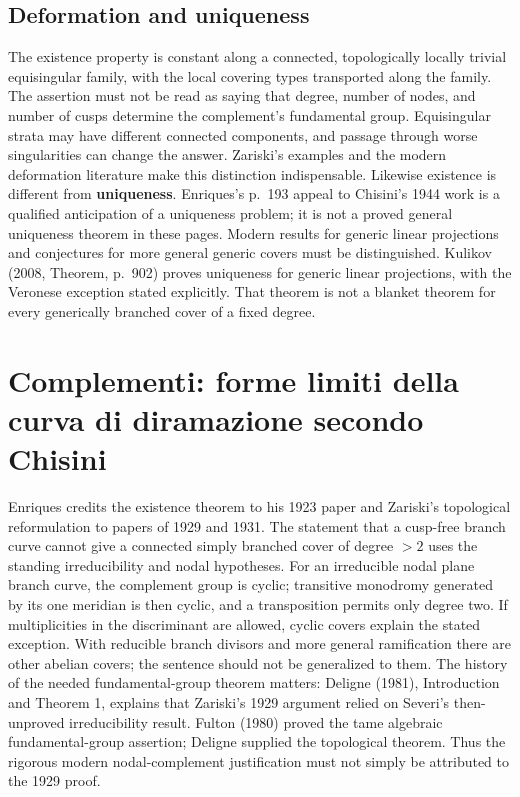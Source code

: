 \subsection{Deformation and uniqueness}

The existence property is constant along a connected, topologically locally trivial equisingular family, with the local covering types transported along the family. The assertion must not be read as saying that degree, number of nodes, and number of cusps determine the complement's fundamental group. Equisingular strata may have different connected components, and passage through worse singularities can change the answer. Zariski's examples and the modern deformation literature make this distinction indispensable. Likewise existence is different from \textbf{uniqueness}. Enriques's p.~193 appeal to Chisini's 1944 work is a qualified anticipation of a uniqueness problem; it is not a proved general uniqueness theorem in these pages. Modern results for generic linear projections and conjectures for more general generic covers must be distinguished. Kulikov (2008, Theorem, p.~902) proves uniqueness for generic linear projections, with the Veronese exception stated explicitly. That theorem is not a blanket theorem for every generically branched cover of a fixed degree.

\section[Le degenerazioni di Chisini]{Complementi: forme limiti della curva di diramazione secondo Chisini}
\label{cp1-v-10}

Enriques credits the existence theorem to his 1923 paper and Zariski's topological reformulation to papers of 1929 and 1931. The statement that a cusp-free branch curve cannot give a connected simply branched cover of degree \(>2\) uses the standing irreducibility and nodal hypotheses. For an irreducible nodal plane branch curve, the complement group is cyclic; transitive monodromy generated by its one meridian is then cyclic, and a transposition permits only degree two. If multiplicities in the discriminant are allowed, cyclic covers explain the stated exception. With reducible branch divisors and more general ramification there are other abelian covers; the sentence should not be generalized to them. The history of the needed fundamental-group theorem matters: Deligne (1981), Introduction and Theorem 1, explains that Zariski's 1929 argument relied on Severi's then-unproved irreducibility result. Fulton (1980) proved the tame algebraic fundamental-group assertion; Deligne supplied the topological theorem. Thus the rigorous modern nodal-complement justification must not simply be attributed to the 1929 proof.

